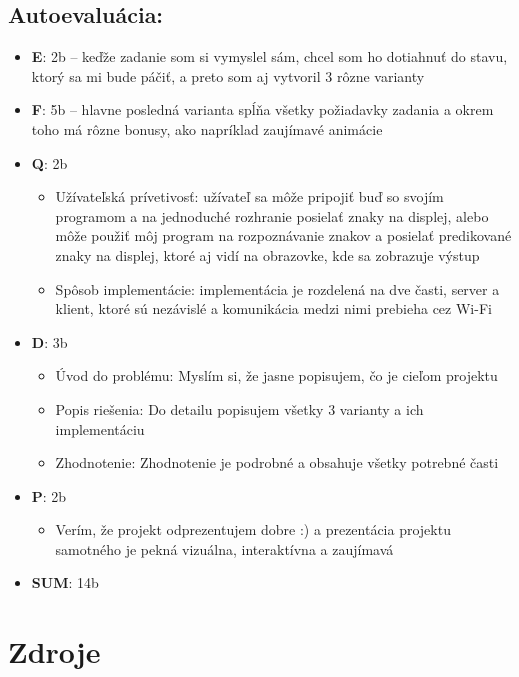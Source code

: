 \documentclass[a4paper, 12pt]{article}
\begin{document}
\subsection*{Autoevaluácia:}
\begin{itemize}
    \item \textbf{E}: 2b – keďže zadanie som si vymyslel sám, chcel som ho dotiahnuť do stavu, ktorý sa mi bude páčiť, a preto som aj vytvoril 3 rôzne varianty
    \item \textbf{F}: 5b – hlavne posledná varianta spĺňa všetky požiadavky zadania a okrem toho má rôzne bonusy, ako napríklad zaujímavé animácie
    \item \textbf{Q}: 2b
    \begin{itemize}
        \item Užívateľská prívetivosť: užívateľ sa môže pripojiť buď so svojím programom a na jednoduché rozhranie posielať znaky na displej, alebo môže použiť môj program na rozpoznávanie znakov a posielať predikované znaky na displej, ktoré aj vidí na obrazovke, kde sa zobrazuje výstup
        \item Spôsob implementácie: implementácia je rozdelená na dve časti, server a klient, ktoré sú nezávislé a komunikácia medzi nimi prebieha cez Wi-Fi
    \end{itemize}
    \item \textbf{D}: 3b
    \begin{itemize}
        \item Úvod do problému: Myslím si, že jasne popisujem, čo je cieľom projektu
        \item Popis riešenia: Do detailu popisujem všetky 3 varianty a ich implementáciu
        \item Zhodnotenie: Zhodnotenie je podrobné a obsahuje všetky potrebné časti
    \end{itemize}
    \item \textbf{P}: 2b
    \begin{itemize}
        \item Verím, že projekt odprezentujem dobre :) a prezentácia projektu samotného je pekná vizuálna, interaktívna a zaujímavá
    \end{itemize}
    \item \textbf{SUM}: 14b
\end{itemize}

\section*{Zdroje}
\end{document}
